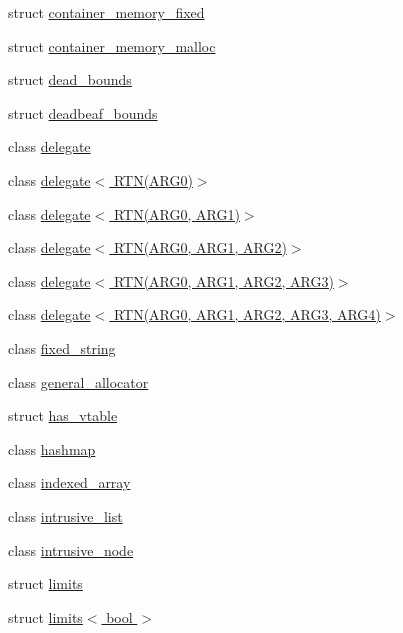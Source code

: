 \begin{DoxyCompactItemize}
\item 
struct \hyperlink{structcrap_1_1container__memory__fixed}{container\+\_\+memory\+\_\+fixed}
\item 
struct \hyperlink{structcrap_1_1container__memory__malloc}{container\+\_\+memory\+\_\+malloc}
\item 
struct \hyperlink{structcrap_1_1dead__bounds}{dead\+\_\+bounds}
\item 
struct \hyperlink{structcrap_1_1deadbeaf__bounds}{deadbeaf\+\_\+bounds}
\item 
class \hyperlink{classcrap_1_1delegate}{delegate}
\item 
class \hyperlink{classcrap_1_1delegate_3_01_r_t_n_07_a_r_g0_08_4}{delegate$<$ R\+T\+N(\+A\+R\+G0)$>$}
\item 
class \hyperlink{classcrap_1_1delegate_3_01_r_t_n_07_a_r_g0_00_01_a_r_g1_08_4}{delegate$<$ R\+T\+N(\+A\+R\+G0, A\+R\+G1)$>$}
\item 
class \hyperlink{classcrap_1_1delegate_3_01_r_t_n_07_a_r_g0_00_01_a_r_g1_00_01_a_r_g2_08_4}{delegate$<$ R\+T\+N(\+A\+R\+G0, A\+R\+G1, A\+R\+G2)$>$}
\item 
class \hyperlink{classcrap_1_1delegate_3_01_r_t_n_07_a_r_g0_00_01_a_r_g1_00_01_a_r_g2_00_01_a_r_g3_08_4}{delegate$<$ R\+T\+N(\+A\+R\+G0, A\+R\+G1, A\+R\+G2, A\+R\+G3)$>$}
\item 
class \hyperlink{classcrap_1_1delegate_3_01_r_t_n_07_a_r_g0_00_01_a_r_g1_00_01_a_r_g2_00_01_a_r_g3_00_01_a_r_g4_08_4}{delegate$<$ R\+T\+N(\+A\+R\+G0, A\+R\+G1, A\+R\+G2, A\+R\+G3, A\+R\+G4)$>$}
\item 
class \hyperlink{classcrap_1_1fixed__string}{fixed\+\_\+string}
\item 
class \hyperlink{classcrap_1_1general__allocator}{general\+\_\+allocator}
\item 
struct \hyperlink{structcrap_1_1has__vtable}{has\+\_\+vtable}
\item 
class \hyperlink{classcrap_1_1hashmap}{hashmap}
\item 
class \hyperlink{classcrap_1_1indexed__array}{indexed\+\_\+array}
\item 
class \hyperlink{singletoncrap_1_1intrusive__list}{intrusive\+\_\+list}
\item 
class \hyperlink{classcrap_1_1intrusive__node}{intrusive\+\_\+node}
\item 
struct \hyperlink{structcrap_1_1limits}{limits}
\item 
struct \hyperlink{structcrap_1_1limits_3_01bool_01_4}{limits$<$ bool $>$}
\item 

\end{DoxyCompactItemize}
